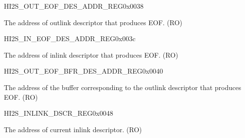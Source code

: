 \begin{register}{H}{I2S\_OUT\_EOF\_DES\_ADDR\_REG}{0x0038}\label{regdesc:I2SOUTEOFDESADDRREG}
%
\regnewline%
\begin{regdesc}\begin{reglist}
\item [I2S\_OUT\_EOF\_DES\_ADDR\_REG]The address of outlink descriptor that produces EOF. (RO)
\end{reglist}\end{regdesc}
\end{register}


\begin{register}{H}{I2S\_IN\_EOF\_DES\_ADDR\_REG}{0x003c}\label{regdesc:I2SINEOFDESADDRREG}
%
\regnewline%
\begin{regdesc}\begin{reglist}
\item [I2S\_IN\_EOF\_DES\_ADDR\_REG]The address of inlink descriptor that produces EOF. (RO)
\end{reglist}\end{regdesc}
\end{register}


\begin{register}{H}{I2S\_OUT\_EOF\_BFR\_DES\_ADDR\_REG}{0x0040}\label{regdesc:I2SOUTEOFBFRDESADDRREG}
%
\regnewline%
\begin{regdesc}\begin{reglist}
\item [I2S\_OUT\_EOF\_BFR\_DES\_ADDR\_REG]The address of the buffer corresponding to the outlink descriptor that produces EOF. (RO)
\end{reglist}\end{regdesc}
\end{register}


\begin{register}{H}{I2S\_INLINK\_DSCR\_REG}{0x0048}\label{regdesc:I2SINLINKDSCRREG}
%
\regnewline%
\begin{regdesc}\begin{reglist}
\item [I2S\_INLINK\_DSCR\_REG]The address of current inlink descriptor. (RO)
\end{reglist}\end{regdesc}
\end{register}


